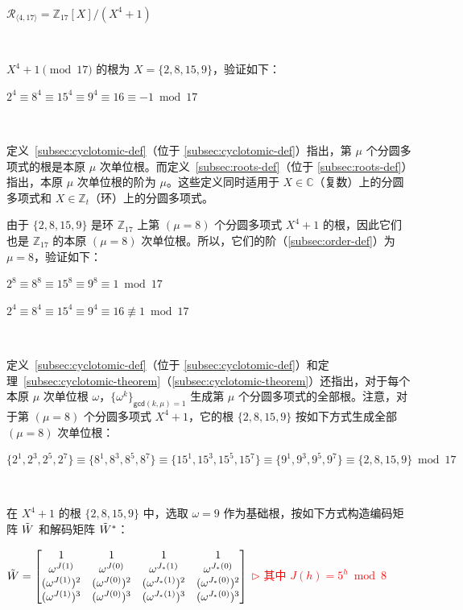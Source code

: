 $ $

$\mathcal{R}_{\langle 4, 17 \rangle} = \mathbb{Z}_{17}[X] / (X^4 + 1)$

$ $

$X^4 + 1 \pmod{17}$ 的根为 $X = \{2, 8, 15, 9\}$，验证如下：

$2^4 \equiv 8^4 \equiv 15^4 \equiv 9^4 \equiv 16 \equiv -1 \bmod{17}$

$ $

定义~\ref*{subsec:cyclotomic-def}（位于 \autoref{subsec:cyclotomic-def}）指出，第 $\mu$ 个分圆多项式的根是本原 $\mu$ 次单位根。而定义~\ref*{subsec:roots-def}（位于 \autoref{subsec:roots-def}）指出，本原 $\mu$ 次单位根的阶为 $\mu$。这些定义同时适用于 $X\in\mathbb{C}$（复数）上的分圆多项式和 $X \in \mathbb{Z}_t$（环）上的分圆多项式。

由于 $\{2, 8, 15, 9\}$ 是环 $\mathbb{Z}_{17}$ 上第 $(\mu=8)$ 个分圆多项式 $X^4 + 1$ 的根，因此它们也是 $\mathbb{Z}_{17}$ 的本原 $(\mu=8)$ 次单位根。所以，它们的阶（\autoref{subsec:order-def}）为 $\mu=8$，验证如下：

$2^8 \equiv 8^8 \equiv 15^8 \equiv 9^8 \equiv 1 \bmod 17$

$2^4 \equiv 8^4 \equiv 15^4 \equiv 9^4 \equiv 16 \not\equiv 1 \bmod 17$

$ $

定义~\ref*{subsec:cyclotomic-def}（位于 \autoref{subsec:cyclotomic-def}）和定理~\ref*{subsec:cyclotomic-theorem}（\autoref{subsec:cyclotomic-theorem}）还指出，对于每个本原 $\mu$ 次单位根 $\omega$，$\{\omega^k\}_{\textsf{gcd}(k, \mu) = 1}$ 生成第 $\mu$ 个分圆多项式的全部根。注意，对于第 $(\mu=8)$ 个分圆多项式 $X^4 + 1$，它的根 $\{2, 8, 15, 9\}$ 按如下方式生成全部 $(\mu=8)$ 次单位根：

$\{2^1, 2^3, 2^5, 2^7\} \equiv \{8^1, 8^3, 8^5, 8^7\} \equiv \{15^1, 15^3, 15^5, 15^7\} \equiv \{9^1, 9^3, 9^5, 9^7\} \equiv \{2, 8, 15, 9\} \bmod 17$

$ $

在 $X^4 + 1$ 的根 $\{2, 8, 15, 9\}$ 中，选取 $\omega = 9$ 作为基础根，按如下方式构造编码矩阵 $\tilde{W}$ 和解码矩阵 $\tilde{W}^*$：

$\tilde{W} = \begin{bmatrix}
1 & 1 & 1 & 1\\
\omega^{J(1)} & \omega^{J(0)} & \omega^{J_*(1)} & \omega^{J_*(0)}\\
(\omega^{J(1)})^2 & (\omega^{J(0)})^2 & (\omega^{J_*(1)})^2 & (\omega^{J_*(0)})^2\\
(\omega^{J(1)})^3 & (\omega^{J(0)})^3 & (\omega^{J_*(1)})^3 & (\omega^{J_*(0)})^3\\
\end{bmatrix}$ \textcolor{red}{  $\rhd$ 其中 $J(h) = 5^h \bmod 8$}

